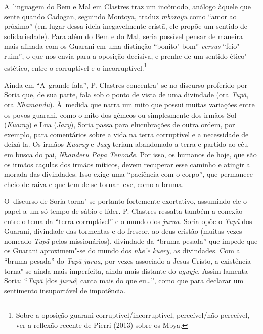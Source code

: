 A~linguagem do Bem e Mal em Clastres traz um incômodo, análogo àquele
que sente quando Cadogan, seguindo Montoya, traduz \emph{mborayu} como ``amor
ao próximo'' (em lugar dessa ideia inegavelmente cristã, ele propõe um sentido
de solidariedade). Para além do Bem e do Mal, seria
possível pensar de maneira mais afinada com os Guarani em uma distinção
``bonito"-bom'' \emph{versus} ``feio"-ruim'', o que nos envia para a oposição decisiva,
e prenhe de um sentido ético"-estético, entre o corruptível e o
incorruptível.\footnote{Sobre a oposição guarani
corruptível/incorruptível, perecível/não perecível, ver a reflexão
recente de Pierri (2013) sobre os Mbya. } 

Ainda em ``A~grande fala'', P. Clastres concentra"-se no discurso proferido
por Soria que, de sua parte, fala sob o ponto de vista de uma divindade
(ora \emph{Tupã}, ora \emph{Nhamandu}). À~medida que narra um mito que possui muitas
variações entre os povos guarani, como o mito dos gêmeos ou
simplesmente dos irmãos Sol (\emph{Kuaray}) e Lua (\emph{Jaxy}), Soria passa para
elucubrações de outra ordem, por exemplo, para comentários sobre a vida
na terra corruptível e a necessidade de deixá-la. Os irmãos \emph{Kuaray} e
\emph{Jaxy} teriam abandonado a terra e partido ao céu em busca do pai,
\emph{Nhanderu Papa Tenonde}. Por isso, os humanos de hoje, que são os irmãos
caçulas dos irmãos míticos, devem recuperar esse caminho e atingir a
morada das divindades. Isso exige uma ``paciência com o corpo'', que
permanece cheio de raiva e que tem de se tornar leve, como a bruma. 

O~discurso de Soria torna"-se portanto fortemente exortativo, assumindo
ele o papel a um só tempo de sábio e líder. P. Clastres ressalta também
a conexão entre o tema da ``terra corruptível'' e o mundo dos \emph{jurua}.
Soria opõe o \emph{Tupã} dos Guarani, divindade das tormentas e do frescor, ao
deus cristão (muitas vezes nomeado \emph{Tupã} pelos missionários), divindade
da ``bruma pesada'' que impede que os Guarani aproximem"-se do mundo dos
\emph{nhe’e kuery}, as divindades. Com a ``bruma pesada'' do \emph{Tupã} \emph{jurua}, por
vezes associado a Jesus Cristo, a existência torna"-se ainda mais
imperfeita, ainda mais distante do \emph{aguyje}. Assim lamenta Soria: ``\emph{Tupã}
[dos \emph{juruá}] canta mais do que eu\ldots{}'', como que para declarar um
sentimento insuportável de impotência. 

